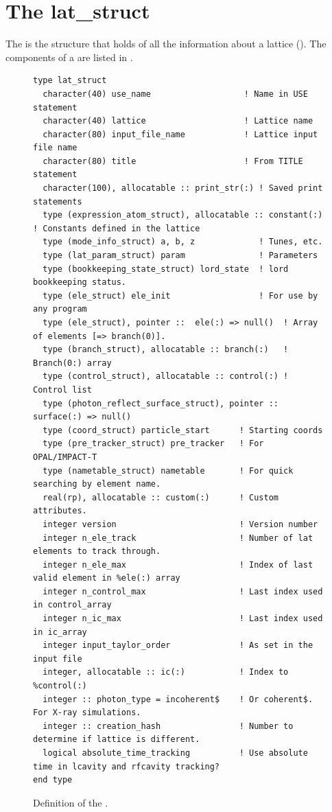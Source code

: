 \chapter{The lat_struct}
\label{c:lat.struct}

The  is the structure that holds of all the information
about a lattice (). The components of a
 are listed in .
\begin{figure}[htb]
\centering
\begin{verbatim}
type lat_struct
  character(40) use_name                   ! Name in USE statement
  character(40) lattice                    ! Lattice name
  character(80) input_file_name            ! Lattice input file name
  character(80) title                      ! From TITLE statement
  character(100), allocatable :: print_str(:) ! Saved print statements
  type (expression_atom_struct), allocatable :: constant(:)  ! Constants defined in the lattice
  type (mode_info_struct) a, b, z             ! Tunes, etc.                       
  type (lat_param_struct) param               ! Parameters                        
  type (bookkeeping_state_struct) lord_state  ! lord bookkeeping status.          
  type (ele_struct) ele_init                  ! For use by any program            
  type (ele_struct), pointer ::  ele(:) => null()  ! Array of elements [=> branch(0)].
  type (branch_struct), allocatable :: branch(:)   ! Branch(0:) array
  type (control_struct), allocatable :: control(:) ! Control list
  type (photon_reflect_surface_struct), pointer :: surface(:) => null()
  type (coord_struct) particle_start      ! Starting coords
  type (pre_tracker_struct) pre_tracker   ! For OPAL/IMPACT-T
  type (nametable_struct) nametable       ! For quick searching by element name.
  real(rp), allocatable :: custom(:)      ! Custom attributes.
  integer version                         ! Version number
  integer n_ele_track                     ! Number of lat elements to track through.
  integer n_ele_max                       ! Index of last valid element in %ele(:) array
  integer n_control_max                   ! Last index used in control_array
  integer n_ic_max                        ! Last index used in ic_array
  integer input_taylor_order              ! As set in the input file
  integer, allocatable :: ic(:)           ! Index to %control(:)
  integer :: photon_type = incoherent$    ! Or coherent$. For X-ray simulations.
  integer :: creation_hash                ! Number to determine if lattice is different.
  logical absolute_time_tracking          ! Use absolute time in lcavity and rfcavity tracking?
end type
\end{verbatim}
\caption{Definition of the .}
\label{f:lat.struct}
\end{figure}

